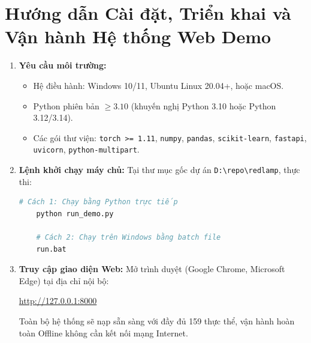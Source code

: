 \documentclass[11pt,journal,onecolumn]{IEEEtran}
\begin{document}
\section{Hướng dẫn Cài đặt, Triển khai và Vận hành Hệ thống Web Demo}
\begin{enumerate}
    \item \textbf{Yêu cầu môi trường:}
    \begin{itemize}
        \item Hệ điều hành: Windows 10/11, Ubuntu Linux 20.04+, hoặc macOS.
        \item Python phiên bản $\ge 3.10$ (khuyến nghị Python 3.10 hoặc Python 3.12/3.14).
        \item Các gói thư viện: \texttt{torch >= 1.11}, \texttt{numpy}, \texttt{pandas}, \texttt{scikit-learn}, \texttt{fastapi}, \texttt{uvicorn}, \texttt{python-multipart}.
    \end{itemize}
    \item \textbf{Lệnh khởi chạy máy chủ:}
    Tại thư mục gốc dự án \texttt{D:\textbackslash repo\textbackslash redlamp}, thực thi:
    \begin{lstlisting}[language=bash]
    # Cách 1: Chạy bằng Python trực tiếp
    python run_demo.py
    
    # Cách 2: Chạy trên Windows bằng batch file
    run.bat
    \end{lstlisting}
    \item \textbf{Truy cập giao diện Web:}
    Mở trình duyệt (Google Chrome, Microsoft Edge) tại địa chỉ nội bộ:
    \begin{center}
        \url{http://127.0.0.1:8000}
    \end{center}
    Toàn bộ hệ thống sẽ nạp sẵn sàng với đầy đủ 159 thực thể, vận hành hoàn toàn Offline không cần kết nối mạng Internet.
\end{enumerate}
\end{document}

